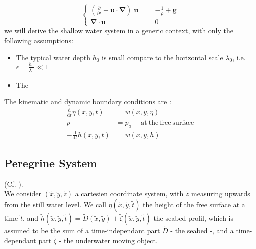 \documentclass[11pt,a4paper]{article}
\begin{document}
\begin{equation}
	\left\lbrace
		\begin{array}{rll}
\displaystyle (\frac{\partial}{\partial t} + \mathbf{u} \cdot \mathbf{\nabla}) \; \mathbf{u} & = & \displaystyle -\frac{1}{\rho} + \mathbf{g} \\
\mathbf{\nabla} \cdot \mathbf{u} & = & 0 
		\end{array}
	\right.
\end{equation}
we will derive the shallow water system in a generic context, with only the following assumptions: 
\begin{itemize}
\item The typical water depth $h_0$ is small compare to the horizontal scale $\lambda_0$, i.e. $\epsilon = \frac{h_0}{\lambda_0} \ll 1 $
\item The
\end{itemize}
The kinematic and dynamic boundary conditions are : 
\begin{align}
\frac{\mathrm{d}}{\mathrm{d} t} \eta(x,y,t) & = w(x,y,\eta) \\
p & = p_a \: \: \:  \: \: \: \mathrm{at} \: \mathrm{the} \:  \mathrm{free} \: \mathrm{surface}\\
-\frac{\mathrm{d}}{\mathrm{d}t} h(x,y,t) & = w(x,y,h)
\end{align}



\pagebreak

\subsection{Peregrine System}
(Cf. \cite{DM2013}).\\ We consider $(\tilde{x},\tilde{y},\tilde{z})$ a cartesien coordinate system, with $\tilde{z}$ measuring upwards from the still water level. We call $\tilde{\eta}(\tilde{x},\tilde{y},\tilde{t})$ the height of the free surface at a time $\tilde{t}$, and $\tilde{h}(\tilde{x},\tilde{y},\tilde{t}) = \tilde{D}(\tilde{x},\tilde{y}) + \tilde{\zeta}(\tilde{x},\tilde{y},\tilde{t})$ the seabed profil, which is assumed to be the sum of a time-independant part $\tilde{D}$ - the seabed -, and a time-dependant part $\tilde{\zeta}$ - the underwater moving object.
\end{document}
